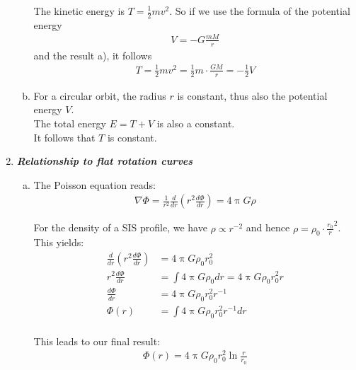 \documentclass[a4paper,12pt]{article}
\newcommand{\question}[1]{\textbf{\textit{#1}}}
\renewcommand{\pi}{\uppi}
\begin{document}
\begin{enumerate}
\begin{enumerate}[(a)]
			The kinetic energy is $T=\frac{1}{2}mv^2$. So if we use the formula of the potential energy 
			\begin{align*}
			V=-G\frac{mM}{r}
			\end{align*}
			and the result a), it follows
			\begin{align*}
			T=\frac{1}{2}mv^2=\frac{1}{2}m\cdot\frac{GM}{r}=-\frac{1}{2}V
			\end{align*}
			\item
			
			For a circular orbit, the radius $r$ is constant, thus also the potential energy $V$.\\
			The total energy $E=T+V$ is also a constant.\\
			It follows that $T$ is constant.
		\end{enumerate}
		
		\setcounter{equation}{0}
		\item \question{Relationship to flat rotation curves}
		\begin{enumerate}[(a)]
			\item The Poisson equation reads: \\
			
			\begin{align*}
			\nabla  \Phi = \frac{1}{r^2} \frac{d}{dr} (r^2 \frac{d\Phi}{dr}) = 4 \pi G \rho
			\end{align*}
			
			For the density of a SIS profile, we have $\rho \propto r^{-2}$ and hence $\rho = \rho_0 \cdot \frac{r_0}{r}^2$.\\             
			This yields: \\
			\begin{align*}
			\frac{d}{dr} (r^2 \frac{d\Phi}{dr}) &= 4 \pi G \rho_0 r_0^2 \\
			r^2 \frac{d\Phi}{dr} &= \int 4 \pi G \rho_0 dr = 4 \pi G \rho_0 r_0^2  r \\
			\frac{d\Phi}{dr} &= 4 \pi G \rho_0 r_0^2 r^{-1} \\
			\Phi(r) &= \int 4 \pi G \rho_0 r_0^2 r^{-1} dr \\
			\end{align*}
			
			This leads to our final result: \\
			\begin{align*}
			\Phi(r) = 4 \pi G \rho_0 r_0^2 \ln \frac{r}{r_0}
			\end{align*}
			
			
			

\end{enumerate}
\end{enumerate}
\end{document}
